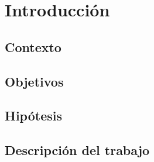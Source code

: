 \section{Introducción}

\subsection{Contexto}
\lipsum[1-3]

\subsection{Objetivos}
\lipsum[4]

\subsection{Hipótesis}
\lipsum[5-6]

\subsection{Descripción del trabajo}
\lipsum[7-9]




